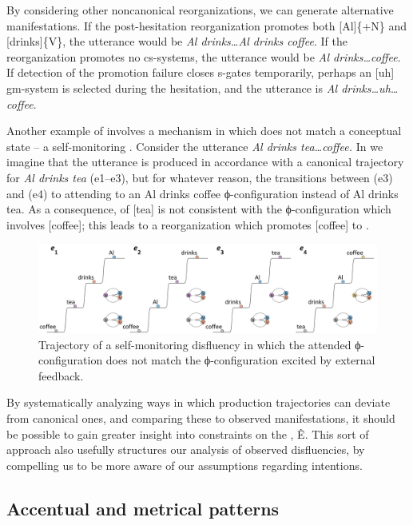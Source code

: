   By considering other noncanonical reorganizations, we can generate alternative manifestations. If the post-hesitation reorganization promotes both [Al]\{+N\} and [drinks]\{V\}, the utterance would be \textit{Al drinks…Al drinks coffee}. If the reorganization promotes no cs-systems, the utterance would be \textit{Al drinks…coffee}. If detection of the promotion failure closes s-gates temporarily, perhaps an [uh] gm-sys\-tem is selected during the hesitation, and the utterance is \textit{Al drinks…uh…coffee}.

  Another example of  involves a mechanism in which  does not match a conceptual state -- a self-monitoring . Consider the utterance \textit{Al drinks tea…coffee.} In {} we imagine that the utterance is produced in accordance with a canonical trajectory for \textit{Al drinks tea} (e1--e3), but for whatever reason, the  transitions between (e3) and (e4) to attending to an {\textbar}Al drinks coffee{\textbar} ϕ-configuration instead of {\textbar}Al drinks tea{\textbar}. As a consequence,  of [tea] is not consistent with the ϕ-configuration which involves [coffee]; this leads to a reorganization which promotes [coffee] to .

  
\begin{figure}
\includegraphics[width=\textwidth]{figures/Tilsen-img62.png}
\caption{Trajectory of a self-monitoring disfluency in which the attended ϕ-configuration does not match the ϕ-configuration excited by external feedback.}
\label{fig:4:12}
\end{figure}
 

  By systematically analyzing ways in which production trajectories can deviate from canonical ones, and comparing these to observed manifestations, it should be possible to gain greater insight into constraints on the , Ê. This sort of approach also usefully structures our analysis of observed disfluencies, by compelling us to be more aware of our assumptions regarding  intentions.

\subsection{Accentual and metrical patterns}

